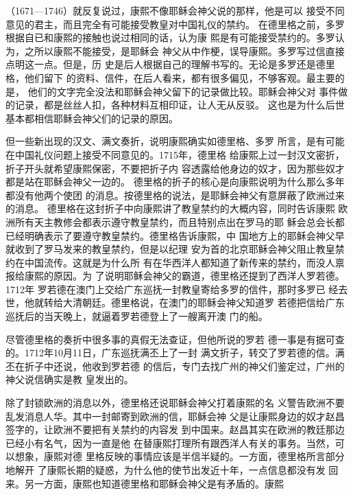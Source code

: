 （1671—1746）就反复说过，康熙不像耶稣会神父说的那样，他是可以%
接受不同意见的君主，而且完全有可能接受教皇对中国礼仪的禁约。%
在德里格之前，多罗根据自已和康熙的接触也说过相同的话，认为康%
熙是有可能接受禁约的。多罗认为，之所以康熙不能接受，是耶稣会%
神父从中作梗，误导康熙。多罗写过信直接点明这一点。但是，历%
史是后人根据自己的理解书写的。无论是多罗还是德里格，他们留下%
的资料、信件，在后人看来，都有很多偏见，不够客观。最主要的是，%
他们的文字完全没法和耶稣会神父留下的记录做比较。耶稣会神父对%
事件做的记录，都是丝丝人扣，各种材料互相印证，让人无从反驳。%
这也是为什么后世基本都相信耶稣会神父们的记录的原因。%
\par
但一些新出现的汉文、满文奏折，说明康熙确实如德里格、多罗%
所言，是有可能在中国礼仪问题上接受不同意见的。1715年，德里格%
给康熙上过一封汉文密折，折子开头就希望康熙保密，不要把折子内%
容透露给他身边的奴才，因为那些奴才都是站在耶稣会神父一边的。%
德里格的折子的核心是向康熙说明为什么那么多年都没有他两个使团%
的消息。按德里格的说法，是耶稣会神父有意屏蔽了欧洲过来的消息。%
德里格在这封折子中向康熙讲了教皇禁约的大概内容，同时告诉康熙%
欧洲所有天主教修会都表示遵守教皇禁约，而且特别点出在罗马的耶%
稣会总会长都已经明确表示了要遵守教皇禁约。德里格告诉康熙，中%
国地方上的耶稣会神父早就收到了罗马发来的教皇禁约，但是以纪理%
安为首的北京耶稣会神父阻止教皇禁约在中国流传。这就是为什么所%
有在华西洋人都知道了新传来的禁约，而没人禀报给康熙的原因。为%
了说明耶稣会神父的霸道，德里格还提到了西洋人罗若德。1712年%
罗若德在澳门上交给广东巡抚一封教皇寄给多罗的信件，那时多罗已%
经去世，他就转给大清朝廷。德里格说，在澳门的耶稣会神父知道罗%
若德把信给广东巡抚后的当天晚上，就逼着罗若德登上了一艘离开澳%
门的船。%
\par
尽管德里格的奏折中很多事的真假无法查证，但他所说的罗若%
德一事是有据可查的。1712年10月11日，广东巡抚满丕上了一封%
满文折子，转交了罗若德的信。满丕在折子中还说，他收到罗若德%
的信后，专门去找广州的神父们鉴定过，广州的神父说信确实是教%
皇发出的。%
\par
除了封锁欧洲的消息以外，德里格还说耶稣会神父打着康熙的名%
义警告欧洲不要乱发消息人华。其中一封邮寄到欧洲的信，耶稣会神%
父是让康熙身边的奴才赵昌签字的，让欧洲不要把有关禁约的内容发%
到中国来。赵昌其实在欧洲的教廷那边已经小有名气，因为一直是他%
在替康熙打理所有跟西洋人有关的事务。当然，可以想象，康熙对德%
里格反映的事情应该是半信半疑的。一方面，德里格所言部分地解开%
了康熙长期的疑惑，为什么他的使节出发近十年，一点信息都没有发%
回来。另一方面，康熙也知道德里格和耶稣会神父是有矛盾的。康熙%
